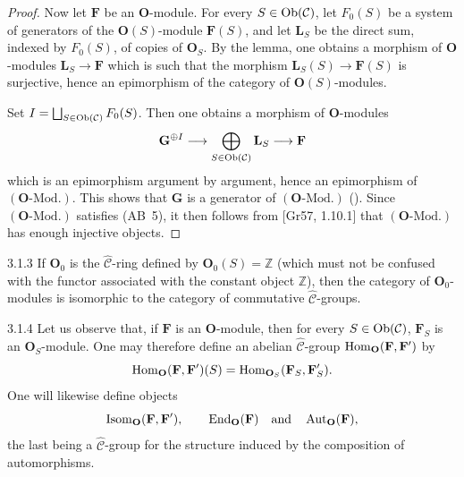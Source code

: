 \begin{proof}
Now let \(\mathbf{F}\) be an \(\mathbf{O}\)-module. For every
\(S\in\operatorname{Ob}(\mathcal{C})\), let \(F_0(S)\) be a system of generators of the
\(\mathbf{O}(S)\)-module \(\mathbf{F}(S)\), and let \(\mathbf{L}_S\) be the
direct sum, indexed by \(F_0(S)\), of copies of \(\mathbf{O}_S\). By the
lemma, one obtains a morphism of \(\mathbf{O}\)-modules
\(\mathbf{L}_S\to\mathbf{F}\) which is such that the morphism
\(\mathbf{L}_S(S)\to\mathbf{F}(S)\) is surjective, hence an epimorphism of
the category of \(\mathbf{O}(S)\)-modules.

Set \(I=\bigsqcup_{S\in\operatorname{Ob}(\mathcal{C})}F_0(S)\). Then one obtains a morphism
of \(\mathbf{O}\)-modules
\[
\mathbf{G}^{\oplus I}
\longrightarrow\bigoplus_{S\in\operatorname{Ob}(\mathcal{C})}\mathbf{L}_S
\longrightarrow\mathbf{F}
\]
which is an epimorphism \og argument by argument\fg, hence an epimorphism
of \((\mathbf{O}\text{-Mod.})\). This shows that \(\mathbf{G}\) is a
generator of \((\mathbf{O}\text{-Mod.})\) (\cf [Gr57, 1.9.1]). Since
\((\mathbf{O}\text{-Mod.})\) satisfies (AB~5), it then follows from
[Gr57, 1.10.1] that \((\mathbf{O}\text{-Mod.})\) has enough injective
objects.
\end{proof}

\begin{remark}{3.1.3}\label{I.3.1.3}
If \(\mathbf{O}_0\) is the \(\widehat{\mathcal{C}}\)-ring defined by
\(\mathbf{O}_0(S)=\mathbb{Z}\) (which must not be confused with the functor
associated with the constant object \(\mathbb{Z}\)), then the category of
\(\mathbf{O}_0\)-modules is isomorphic to the category of commutative
\(\widehat{\mathcal{C}}\)-groups.
\end{remark}

\begin{definition}{3.1.4}\label{I.3.1.4}
Let us observe that, if \(\mathbf{F}\) is an \(\mathbf{O}\)-module, then for
every \(S\in\operatorname{Ob}(\mathcal{C})\), \(\mathbf{F}_S\) is an
\(\mathbf{O}_S\)-module. One may therefore define an abelian
\(\widehat{\mathcal{C}}\)-group \(\operatorname{Hom}_{\mathbf{O}}(\mathbf{F},\mathbf{F}')\)
by
\[
\operatorname{Hom}_{\mathbf{O}}(\mathbf{F},\mathbf{F}')(S)
=\operatorname{Hom}_{\mathbf{O}_S}(\mathbf{F}_S,\mathbf{F}'_S).
\]
One will likewise define objects
\[
\operatorname{Isom}_{\mathbf{O}}(\mathbf{F},\mathbf{F}'),
\qquad
\operatorname{End}_{\mathbf{O}}(\mathbf{F})
\quad\text{and}\quad
\operatorname{Aut}_{\mathbf{O}}(\mathbf{F}),
\]
the last being a \(\widehat{\mathcal{C}}\)-group for the structure induced
by the composition of automorphisms.
\end{definition}

